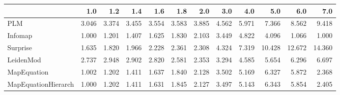 \begin{tabular}{lrrrrrrrrrrr}
\toprule
{} &   1.0 &   1.2 &   1.4 &   1.6 &   1.8 &   2.0 &   3.0 &   4.0 &    5.0 &    6.0 &    7.0 \\
\midrule
PLM                 & 3.046 & 3.374 & 3.455 & 3.554 & 3.583 & 3.885 & 4.562 & 5.971 &  7.366 &  8.562 &  9.418 \\
Infomap             & 1.000 & 1.201 & 1.407 & 1.625 & 1.830 & 2.103 & 3.449 & 4.822 &  4.096 &  1.066 &  1.000 \\
Surprise            & 1.635 & 1.820 & 1.966 & 2.228 & 2.361 & 2.308 & 4.324 & 7.319 & 10.428 & 12.672 & 14.360 \\
LeidenMod           & 2.737 & 2.948 & 2.902 & 2.820 & 2.581 & 2.353 & 3.294 & 4.585 &  5.654 &  6.296 &  6.697 \\
MapEquation         & 1.002 & 1.202 & 1.411 & 1.637 & 1.840 & 2.128 & 3.502 & 5.169 &  6.327 &  5.872 &  2.368 \\
MapEquationHierarch & 1.000 & 1.202 & 1.411 & 1.631 & 1.845 & 2.127 & 3.497 & 5.143 &  6.343 &  5.854 &  2.405 \\
\bottomrule
\end{tabular}
